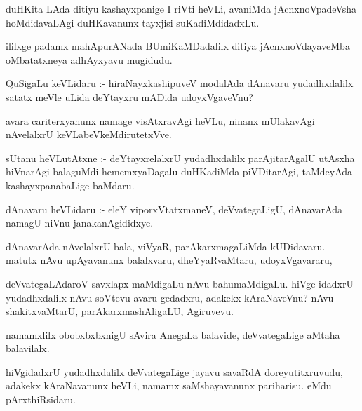 \documentclass{article}
\begin{document}
\begin{mn}
duHKita LAda ditiyu kashayxpanige I riVti heVLi, avaniMda jAcnxnoVpadeVsha
 hoMdidavaLAgi duHKavanunx tayxjisi suKadiMdidadxLu. 
\end{mn}

\begin{mn}
ililxge padamx mahApurANada BUmiKaMDadalilx ditiya jAcnxnoVdayaveMba 
oMbatatxneya adhAyxyavu mugidudu.
\end{mn}


\begin{mn}
QuSigaLu keVLidaru :-  hiraNayxkashipuveV modalAda dAnavaru yudadhxdalilx 
satatx meVle uLida deYtayxru mADida udoyxVgaveVnu?
\end{mn}

\begin{mn}
avara cariterxyanunx namage visAtxravAgi heVLu, ninanx mUlakavAgi nAvelalxrU keVLabeVkeMdirutetxVve. 
\end{mn}

\begin{mn}
sUtanu heVLutAtxne :- deYtayxrelalxrU yudadhxdalilx parAjitarAgalU utAsxha
 hiVnarAgi balaguMdi hememxyaDagalu duHKadiMda piVDitarAgi, taMdeyAda 
 kashayxpanabaLige baMdaru.
\end{mn}

\begin{mn}
dAnavaru heVLidaru :- eleY viporxVtatxmaneV, deVvategaLigU, dAnavarAda 
namagU niVnu janakanAgididxye.
\end{mn}

\begin{mn}
dAnavarAda nAvelalxrU bala, viVyaR, parAkarxmagaLiMda kUDidavaru. matutx 
nAvu upAyavanunx balalxvaru, dheYyaRvaMtaru, udoyxVgavararu,
\end{mn}

\begin{mn}
deVvategaLAdaroV savxlapx maMdigaLu nAvu bahumaMdigaLu. hiVge idadxrU 
yudadhxdalilx nAvu soVtevu avaru gedadxru, adakekx kAraNaveVnu?  nAvu 
shakitxvaMtarU, parAkarxmashAligaLU, Agiruvevu. 
\end{mn}

\begin{mn}namamxlilx obobxbxbxnigU sAvira AnegaLa balavide,  deVvategaLige 
aMtaha balavilalx. 
\end{mn}

\begin{mn}
hiVgidadxrU yudadhxdalilx deVvategaLige jayavu savaRdA doreyutitxruvudu, 
adakekx kAraNavanunx heVLi, namamx saMshayavanunx pariharisu. eMdu pArxthiRsidaru.
\end{mn}
\end{document}
